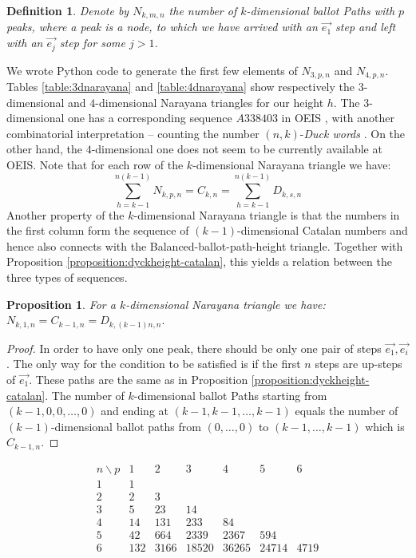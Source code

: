 \documentclass[12pt,notitlepage]{amsart}
\numberwithin{equation}{section}
\theoremstyle{thmstyleone}%
\newtheorem{proposition}[theorem]{Proposition}%
\theoremstyle{thmstyletwo}%
\theoremstyle{thmstylethree}%
\newtheorem{definition}[theorem]{Definition}%
\numberwithin{theorem}{section}
\numberwithin{equation}{section}
\begin{document}
\begin{definition}
Denote by $N_{k,m,n}$ the number of $k$-dimensional ballot Paths with $p$ peaks, where a peak is a node, to which we have arrived with an $\vec{e_1}$ step and left with an $\vec{e_j}$ step for some $j > 1$.

\end{definition}
We wrote Python code to generate the first few elements of $N_{3,p,n}$ and $N_{4,p,n}$. Tables \ref{table:3dnarayana} and \ref{table:4dnarayana} show respectively the $3$-dimensional and $4$-dimensional Narayana triangles for our height $h$. The $3$-dimensional one has a corresponding sequence $A338403$ in OEIS \cite{oeis}, with another combinatorial interpretation -- counting the number $(n,k)$-\textit{Duck words} \cite{duckwords}. On the other hand, the $4$-dimensional one does not seem to be currently available at OEIS. Note that for each row of the $k$-dimensional Narayana triangle we have:
$$\sum_{h=k-1}^{n(k-1)} N_{k,p,n} = C_{k,n} =\sum_{h=k-1}^{n(k-1)} D_{k,s,n}$$
Another property of the $k$-dimensional Narayana triangle is that the numbers in the first column form the sequence of $(k-1)$-dimensional Catalan numbers and hence also connects with the Balanced-ballot-path-height triangle. Together with Proposition \ref{proposition:dyckheight-catalan}, this yields a relation between the three types of sequences. %
\begin{proposition}
\label{proposition:Narayana-Dyck-Cat}
    For a $k$-dimensional Narayana triangle we have: $N_{k,1,n} = C_{k-1,n} = D_{k,(k-1)n,n}.$
\end{proposition}
\begin{proof}
    In order to have only one peak, there should be only one pair of steps $\vec{e_1},\vec{e_i}$. The only way for the condition to be satisfied is if the first $n$ steps are up-steps of $\vec{e_1}$. These paths are the same as in Proposition \ref{proposition:dyckheight-catalan}. The number of $k$-dimensional ballot Paths starting from $(k-1,0,0,\ldots,0)$ and ending at $(k-1,k-1,\ldots,k-1)$ equals the number of $(k-1)$-dimensional ballot paths from $(0,\ldots,0)$ to $(k-1,\ldots, k-1)$ which is $C_{k-1,n}$.
\end{proof}
\begin{table}

\[
\begin{array}{c|ccccccc} 
n \backslash p & 1 & 2 & 3 & 4 & 5 & 6\\
\hline
1 & 1 &  &  &  \\
2 & 2 & 3 &  &  \\
3 & 5 & 23 & 14 &  \\
4 & 14 & 131 & 233 & 84 \\
5 & 42 & 664 & 2339 & 2367 & 594 \\
6 & 132 & 3166 & 18520 & 36265 & 24714 & 4719 \\\end{array}
\]
\caption{Table of values of $N_{3, p, n}$, the $3$-dimensional Narayana triangle.}\label{table:3dnarayana}
\end{table}
\end{document}
